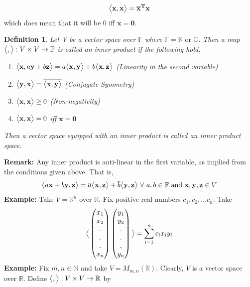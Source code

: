 \documentclass{article}
\newtheorem{definition}{Definition}
\begin{document}
$$\big{<}\mathbf{x},\mathbf{x}\big{>}=\mathbf{\overline{x}^{T}}\mathbf{x}$$ 
which does mean that it will be $0$ iff $\mathbf{x}=\mathbf{0}$.
\begin{definition}
    Let V be a vector space over $\mathbb{F}$ where $\mathbb{F}=\mathbb{R}\text{ or }\mathbb{C}$. Then a map $\big{<},\big{>}:V\times  V\to \mathbb{F}$ is called an inner product if the following hold:
    \begin{enumerate}
        \item $\big{<}\mathbf{x},a\mathbf{y}+b\mathbf{z}\big{>}=a\big{<}\mathbf{x},\mathbf{y}\big{>}+b\big{<}\mathbf{x},\mathbf{z}\big{>}$ (Linearity in the second variable)
        \item $\big{<}\mathbf{y},\mathbf{x}\big{>}=\overline{\big{<}\mathbf{x},\mathbf{y}\big{>}}$ (Conjugate Symmetry)
        \item $\big{<}\mathbf{x},\mathbf{x}\big{>}\geq 0$ (Non-negativity)
        \item $\big{<}\mathbf{x},\mathbf{x}\big{>}=0$ iff $\mathbf{x}=\mathbf{0}$
    \end{enumerate}
    Then a vector space equipped with an inner product is called an inner product space.
\end{definition}
\textbf{Remark:} Any inner product is anti-linear in the first variable, as implied from the conditions given above. That is,
$$\big{<}a\mathbf{x}+b\mathbf{y},\mathbf{z}\big{>}=\overline{a}\big{<}\mathbf{x},\mathbf{z}\big{>}+\overline{b}\big{<}\mathbf{y},\mathbf{z}\big{>}\text{ }\forall\text{ }a,b\in \mathbb{F}\text{ and }\mathbf{x},\mathbf{y},\mathbf{z}\in V$$
\textbf{Example:} Take $V=\mathbb{R}^n$ over $\mathbb{R}$. Fix positive real numbers $c_1,c_2,\dots c_n$. Take
$$
\big{<}
\begin{pmatrix}
    x_1\\
    x_2\\
    .\\
    .\\
    .\\
    x_n
\end{pmatrix}
\begin{pmatrix}
    y_1\\
    y_2\\
    .\\
    .\\
    ,\\
    y_n
\end{pmatrix}
\big{>}
=\sum_{i=1}^{n}c_ix_i y_i
$$
\textbf{Example:} Fix $m,n\in\mathbb{N}$ and take $V=M_{m,n}(\mathbb{R})$. Clearly, $V$ is a vector space over $\mathbb{R}$. Define $\big{<},\big{>}:V\times V\to \mathbb{R}$ by
\end{document}
